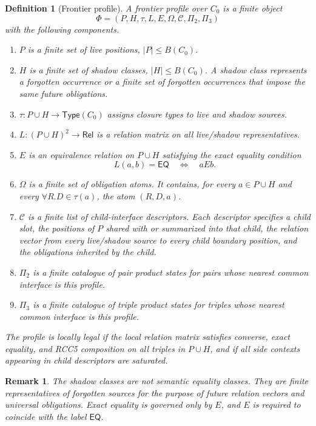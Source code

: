 \documentclass[11pt]{article}
\newtheorem{definition}[theorem]{Definition}
\newtheorem{remark}[theorem]{Remark}
\newcommand{\Rel}{\mathsf{Rel}}
\newcommand{\EQ}{\mathsf{EQ}}
\newcommand{\Typ}{\mathsf{Type}}
\begin{document}
\begin{definition}[Frontier profile]
A frontier profile over $C_0$ is a finite object
\[
  \Phi=(P,H,\tau,L,E,\Omega,\mathcal C,\Pi_2,\Pi_3)
\]
with the following components.
\begin{enumerate}[label=(P\arabic*)]
\item $P$ is a finite set of live positions, $|P|\le B(C_0)$.
\item $H$ is a finite set of shadow classes, $|H|\le B(C_0)$.  A shadow class represents a forgotten occurrence or a finite set of forgotten occurrences that impose the same future obligations.
\item $\tau:P\cup H\to\Typ(C_0)$ assigns closure types to live and shadow sources.
\item $L:(P\cup H)^2\to\Rel$ is a relation matrix on all live/shadow representatives.
\item $E$ is an equivalence relation on $P\cup H$ satisfying the exact equality condition
\[
  L(a,b)=\EQ \quad\Longleftrightarrow\quad aEb.
\]
\item $\Omega$ is a finite set of obligation atoms.  It contains, for every $a\in P\cup H$ and every $\forall R.D\in\tau(a)$, the atom $(R,D,a)$.
\item $\mathcal C$ is a finite list of child-interface descriptors.  Each descriptor specifies a child slot, the positions of $P$ shared with or summarized into that child, the relation vector from every live/shadow source to every child boundary position, and the obligations inherited by the child.
\item $\Pi_2$ is a finite catalogue of pair product states for pairs whose nearest common interface is this profile.
\item $\Pi_3$ is a finite catalogue of triple product states for triples whose nearest common interface is this profile.
\end{enumerate}
The profile is locally legal if the local relation matrix satisfies converse, exact equality, and RCC5 composition on all triples in $P\cup H$, and if all side contexts appearing in child descriptors are saturated.
\end{definition}

\begin{remark}
The shadow classes are not semantic equality classes.  They are finite representatives of forgotten sources for the purpose of future relation vectors and universal obligations.  Exact equality is governed only by $E$, and $E$ is required to coincide with the label $\EQ$.
\end{remark}
\end{document}
